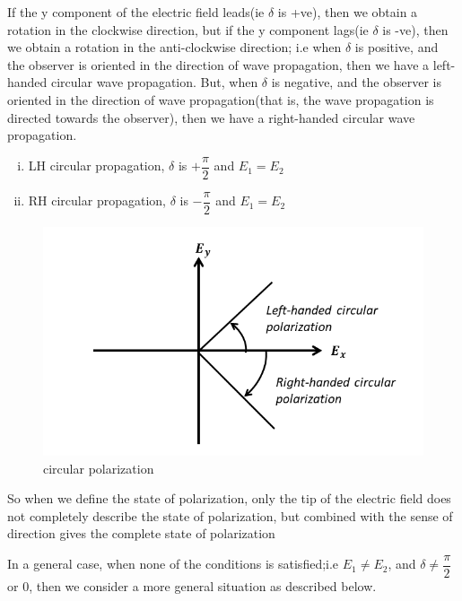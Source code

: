If the y component of the electric field leads(ie $\delta$ is +ve), then we obtain a rotation in the clockwise direction, but if the y component lags(ie $\delta$ is -ve), then we obtain a rotation in the anti-clockwise direction; i.e when $\delta$ is positive, and the observer is oriented in the direction of wave propagation, then we have a left-handed circular wave propagation. But, when $\delta$ is negative, and the observer is oriented in the direction of wave propagation(that is, the wave propagation is directed towards the observer), then we have a right-handed circular wave propagation.
\begin{enumerate}[(i)]
\item LH circular propagation, $\delta$ is $ +\dfrac{\pi}{2}$ and $ E_1 = E_2$
\item RH circular propagation, $\delta$ is $-\dfrac{\pi}{2}$ and $ E_1 = E_2$ 
\end{enumerate}
\begin{figure}[h]
\centering
\includegraphics[width=1\linewidth]{./graphics/circular_polarization}
\caption{circular polarization}
\end{figure} 

So when we define the state of polarization, only the tip of the electric field does not completely describe the state of polarization, but combined with the sense of direction gives the complete state of polarization

In a general case, when none of the conditions is satisfied;i.e $ E_1 \neq E_2$, and $\delta\neq\dfrac{\pi}{2}$ or $ 0 $, then we consider a more general situation as described below.


